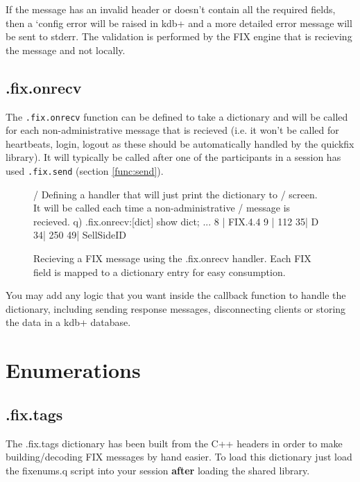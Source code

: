 If the message has an invalid header or doesn't contain all the required fields, then a `config error will be raised in kdb+ and a more detailed error message will be sent to stderr. The validation is performed by the FIX engine that is recieving the message
and not locally.

\subsection{.fix.onrecv}
\label{func:onrecv}

The \texttt{.fix.onrecv} function can be defined to take a dictionary and will be called for each non-administrative message that is recieved (i.e. it won't be called for heartbeats, login, logout as these should be automatically handled by the quickfix library). It will typically be called after one of the participants in a session has used \texttt{.fix.send} (section \ref{func:send}). 

\begin{figure}[H]
\begin{qcode}
/ Defining a handler that will just print the dictionary to
/ screen. It will be called each time a non-administrative
/ message is recieved.
q) .fix.onrecv:{[dict] show dict; }
...
8 | FIX.4.4
9 | 112
35| D
34| 250
49| SellSideID
\end{qcode}
\caption{Recieving a FIX message using the .fix.onrecv handler. Each FIX field is mapped to a dictionary entry for easy consumption. }
\end{figure}

You may add any logic that you want inside the callback function to handle the dictionary, including sending response messages, disconnecting clients or storing
the data in a kdb+ database.

\section{Enumerations}
\subsection{.fix.tags}
The .fix.tags dictionary has been built from the C++ headers in order to make building/decoding FIX messages by hand easier. To load this dictionary just load
the fixenums.q script into your session \textbf{after} loading the shared library.\\

